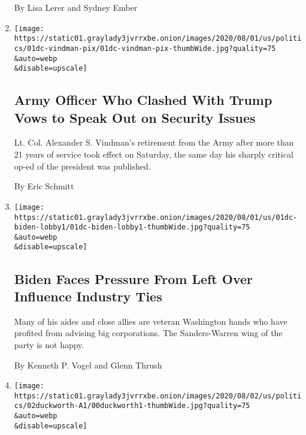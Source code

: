 \begin{enumerate}
  By Lisa Lerer and Sydney Ember
\item
  \href{/2020/08/01/us/politics/alexander-vindman-impeachment-trump.html}{}

  \texttt{[image: https://static01.graylady3jvrrxbe.onion/images/2020/08/01/us/politics/01dc-vindman-pix/01dc-vindman-pix-thumbWide.jpg?quality=75\\\&auto=webp\\\&disable=upscale]}

  \hypertarget{army-officer-who-clashed-with-trump-vows-to-speak-out-on-security-issues}{%
  \subsection{Army Officer Who Clashed With Trump Vows to Speak Out on
  Security
  Issues}\label{army-officer-who-clashed-with-trump-vows-to-speak-out-on-security-issues}}

  Lt. Col. Alexander S. Vindman's retirement from the Army after more
  than 21 years of service took effect on Saturday, the same day his
  sharply critical op-ed of the president was published.

  By Eric Schmitt
\item
  \href{/2020/08/01/us/politics/biden-lobbyist-ties.html}{}

  \texttt{[image: https://static01.graylady3jvrrxbe.onion/images/2020/08/01/us/01dc-biden-lobby1/01dc-biden-lobby1-thumbWide.jpg?quality=75\\\&auto=webp\\\&disable=upscale]}

  \hypertarget{biden-faces-pressure-from-left-over-influence-industry-ties}{%
  \subsection{Biden Faces Pressure From Left Over Influence Industry
  Ties}\label{biden-faces-pressure-from-left-over-influence-industry-ties}}

  Many of his aides and close allies are veteran Washington hands who
  have profited from advising big corporations. The Sanders-Warren wing
  of the party is not happy.

  By Kenneth P. Vogel and Glenn Thrush
\item
  \href{/2020/08/01/us/politics/tammy-duckworth-biden-vp.html}{}

  \texttt{[image: https://static01.graylady3jvrrxbe.onion/images/2020/08/02/us/politics/02duckworth-A1/00duckworth1-thumbWide.jpg?quality=75\\\&auto=webp\\\&disable=upscale]}

  \hypertarget{tammy-duckworth-is-nothing-and-everything-like-joe-biden}{%
}
\end{enumerate}
